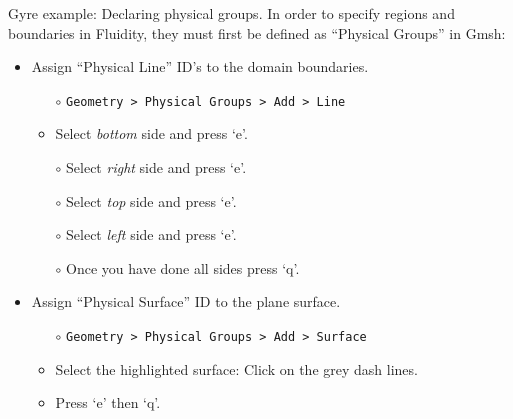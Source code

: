 \documentclass[t]{beamer}
\begin{document}
\begin{frame}{Gyre example: Declaring physical groups.}
In order to specify regions and boundaries in Fluidity, they must first be defined as ``Physical Groups'' in Gmsh:\\[15pt]

\begin{itemize}
   \item Assign ``Physical Line'' ID's to the domain boundaries.
   \begin{itemize}
      \item[$\circ$] \lstinline{Geometry > Physical Groups > Add > Line}
      \item[$\circ$] Select \emph{bottom} side and press `e'.
      \item[$\circ$] Select \emph{right} side and press `e'.
      \item[$\circ$] Select \emph{top} side and press `e'.
      \item[$\circ$] Select \emph{left} side and press `e'.
      \item[$\circ$] Once you have done all sides press `q'.\\[15pt]
   \end{itemize}
   \item Assign ``Physical Surface'' ID to the plane surface.
   \begin{itemize}
      \item[$\circ$] \lstinline{Geometry > Physical Groups > Add > Surface}
      \item[$\circ$] Select the highlighted surface: Click on the grey dash lines.
      \item[$\circ$] Press `e' then `q'.
   \end{itemize}
\end{itemize}
\end{frame}
\end{document}
